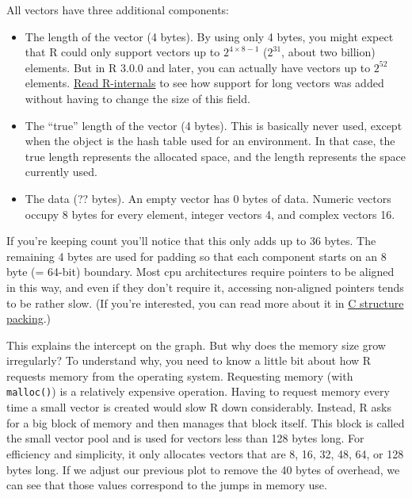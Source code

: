 All vectors have three additional components: 

\begin{itemize}
\item
  The length of the vector (4 bytes). By using only 4 bytes, you might
  expect that R could only support vectors up to
  \(2 ^ {4 \times 8 - 1}\) (\(2 ^ {31}\), about two billion) elements.
  But in R 3.0.0 and later, you can actually have vectors up to
  \(2 ^ {52}\) elements.
  \href{http://cran.r-project.org/doc/manuals/R-ints.html\#Long-vectors}{Read
  R-internals} to see how support for long vectors was added without
  having to change the size of this field. 
\item
  The ``true'' length of the vector (4 bytes). This is basically never
  used, except when the object is the hash table used for an
  environment. In that case, the true length represents the allocated
  space, and the length represents the space currently used.
\item
  The data (?? bytes). An empty vector has 0 bytes of data. Numeric
  vectors occupy 8 bytes for every element, integer vectors 4, and
  complex vectors 16.
\end{itemize}

If you're keeping count you'll notice that this only adds up to 36
bytes. The remaining 4 bytes are used for padding so that each component
starts on an 8 byte (= 64-bit) boundary. Most cpu architectures require
pointers to be aligned in this way, and even if they don't require it,
accessing non-aligned pointers tends to be rather slow. (If you're
interested, you can read more about it in
\href{http://www.catb.org/esr/structure-packing/}{C structure packing}.)

This explains the intercept on the graph. But why does the memory size
grow irregularly? To understand why, you need to know a little bit about
how R requests memory from the operating system. Requesting memory (with
\texttt{malloc()}) is a relatively expensive operation. Having to
request memory every time a small vector is created would slow R down
considerably. Instead, R asks for a big block of memory and then manages
that block itself. This block is called the small vector pool and is
used for vectors less than 128 bytes long. For efficiency and
simplicity, it only allocates vectors that are 8, 16, 32, 48, 64, or 128
bytes long. If we adjust our previous plot to remove the 40 bytes of
overhead, we can see that those values correspond to the jumps in memory
use.

